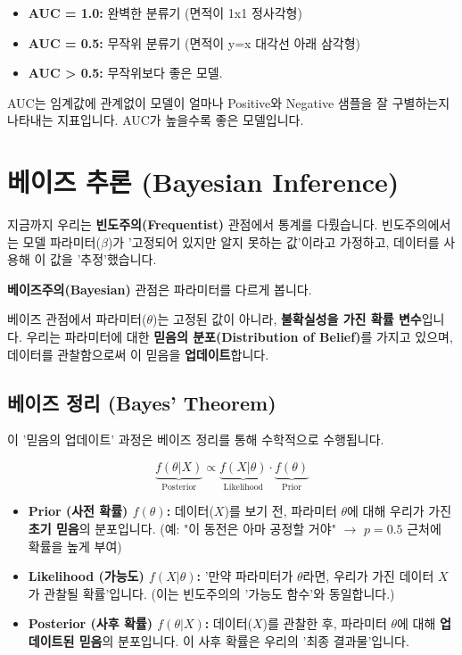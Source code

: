 \documentclass[11pt,a4paper]{book}
\theoremstyle{definition}
\begin{document}
\begin{itemize}
    \item \textbf{AUC = 1.0:} 완벽한 분류기 (면적이 1x1 정사각형)
    \item \textbf{AUC = 0.5:} 무작위 분류기 (면적이 y=x 대각선 아래 삼각형)
    \item \textbf{AUC > 0.5:} 무작위보다 좋은 모델.
\end{itemize}

AUC는 임계값에 관계없이 모델이 얼마나 Positive와 Negative 샘플을 잘 구별하는지 나타내는 지표입니다. AUC가 높을수록 좋은 모델입니다.


\section{베이즈 추론 (Bayesian Inference)}

지금까지 우리는 \textbf{빈도주의(Frequentist)} 관점에서 통계를 다뤘습니다. 빈도주의에서는 모델 파라미터($\beta$)가 '고정되어 있지만 알지 못하는 값'이라고 가정하고, 데이터를 사용해 이 값을 '추정'했습니다.

\textbf{베이즈주의(Bayesian)} 관점은 파라미터를 다르게 봅니다.

\begin{defbox}[title=베이즈 추론의 핵심]
베이즈 관점에서 파라미터($\theta$)는 고정된 값이 아니라, \textbf{불확실성을 가진 확률 변수}입니다.
우리는 파라미터에 대한 \textbf{믿음의 분포(Distribution of Belief)}를 가지고 있으며, 데이터를 관찰함으로써 이 믿음을 \textbf{업데이트}합니다.
\end{defbox}

\subsection{베이즈 정리 (Bayes' Theorem)}

이 '믿음의 업데이트' 과정은 베이즈 정리를 통해 수학적으로 수행됩니다.

$$ \underbrace{f(\theta | X)}_{\text{Posterior}} \propto \underbrace{f(X | \theta)}_{\text{Likelihood}} \cdot \underbrace{f(\theta)}_{\text{Prior}} $$

\begin{itemize}
    \item \textbf{Prior (사전 확률) $f(\theta)$:}
    데이터($X$)를 보기 전, 파라미터 $\theta$에 대해 우리가 가진 \textbf{초기 믿음}의 분포입니다.
    (예: "이 동전은 아마 공정할 거야" $\to$ $p=0.5$ 근처에 확률을 높게 부여)
    
    \item \textbf{Likelihood (가능도) $f(X | \theta)$:}
    '만약 파라미터가 $\theta$라면, 우리가 가진 데이터 $X$가 관찰될 확률'입니다.
    (이는 빈도주의의 '가능도 함수'와 동일합니다.)
    
    \item \textbf{Posterior (사후 확률) $f(\theta | X)$:}
    데이터($X$)를 관찰한 후, 파라미터 $\theta$에 대해 \textbf{업데이트된 믿음}의 분포입니다.
    이 사후 확률은 우리의 '최종 결과물'입니다.
\end{itemize}
\end{document}
